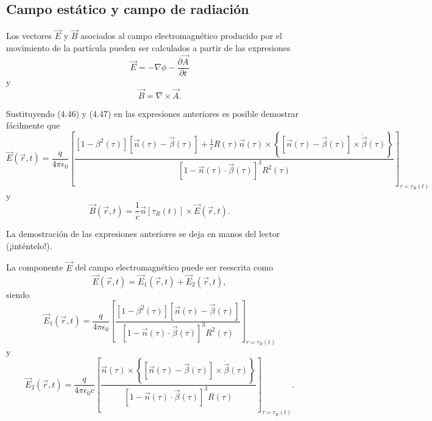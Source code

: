 \documentclass[12pt,a4paper]{book}
\begin{document}
\subsection{Campo estático y campo de radiación}

Los vectores $\vec{E}$ y $\vec{B}$ asociados al campo electromagnético producido por el movimiento de la partícula pueden ser calculados a partir de las expresiones
\begin{equation}
\vec{E} = -\nabla\phi - \frac{\partial\vec{A}}{\partial t}
\end{equation}
y
\begin{equation}
\vec{B} = \nabla \times \vec{A}.
\end{equation}

Sustituyendo (4.46) y (4.47) en las expresiones anteriores es posible demostrar fácilmente que
\begin{equation}
\vec{E}(\vec{r}, t) = \frac{q}{4\pi\epsilon_0}\left[\frac{\left[1 - \beta^2(\tau)\right][\vec{n}(\tau) - \vec{\beta}(\tau)] + \frac{1}{c}R(\tau)\vec{n}(\tau) \times \left\{\left[\vec{n}(\tau) - \vec{\beta}(\tau)\right] \times \dot{\vec{\beta}}(\tau)\right\}}{\left[1 - \vec{n}(\tau) \cdot \vec{\beta}(\tau)\right]^3 R^2(\tau)}\right]_{\tau=\tau_R(t)}
\end{equation}
y
\begin{equation}
\vec{B}(\vec{r}, t) = \frac{1}{c}\vec{n}[\tau_R(t)] \times \vec{E}(\vec{r}, t).
\end{equation}

La demostración de las expresiones anteriores se deja en manos del lector (¡inténtelo!).

La componente $\vec{E}$ del campo electromagnético puede ser reescrita como
\begin{equation}
\vec{E}(\vec{r}, t) = \vec{E}_1(\vec{r}, t) + \vec{E}_2(\vec{r}, t),
\end{equation}
siendo
\begin{equation}
\vec{E}_1(\vec{r}, t) = \frac{q}{4\pi\epsilon_0}\left[\frac{\left[1 - \beta^2(\tau)\right][\vec{n}(\tau) - \vec{\beta}(\tau)]}{\left[1 - \vec{n}(\tau) \cdot \vec{\beta}(\tau)\right]^3 R^2(\tau)}\right]_{\tau=\tau_R(t)}
\end{equation}
y
\begin{equation}
\vec{E}_2(\vec{r}, t) = \frac{q}{4\pi\epsilon_0c}\left[\frac{\vec{n}(\tau) \times \left\{\left[\vec{n}(\tau) - \vec{\beta}(\tau)\right] \times \dot{\vec{\beta}}(\tau)\right\}}{\left[1 - \vec{n}(\tau) \cdot \vec{\beta}(\tau)\right]^3 R(\tau)}\right]_{\tau=\tau_R(t)}.
\end{equation}
\end{document}
